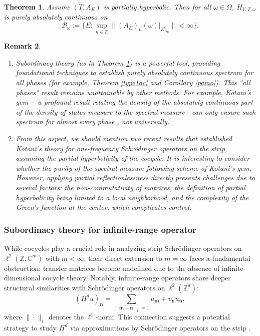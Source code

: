 \documentclass[11pt]{amsart}
\newtheorem{theorem}{Theorem}[section]
\newtheorem{rem}[theorem]{Remark}
\theoremstyle{remark}
\theoremstyle{definition}
\begin{document}
\begin{theorem}\label{thm:main-spectral} Assume $(T,A_E)$ is partially hyperbolic. Then for all $\omega \in \Omega$, $H_{V,T,\omega}$ is purely absolutely continuous on
\begin{equation}\label{defb}
\mathcal{B}_\omega:= \Big\{ E :  \sup_{n \in \mathbb{Z}} \|(A_E)_n(\omega)|_{E^c_{A_E}}\| < \infty \Big\}.
\end{equation}
\end{theorem}



\begin{rem}
\begin{enumerate}
 \item Subordinacy theory (as in Theorem \ref{thm:main-spectral}) is a powerful tool, providing foundational techniques to establish purely absolutely continuous spectrum for all phases (for example, Theorem \ref{type1ac} and Corollary \ref{pamo}).
This ``all phases" result remains unattainable by other methods. For example, Kotani's gem \cite{kotani2}—a profound result \cite{Da} relating the density of the absolutely continuous part of the density of states measure to the spectral measure—can only ensure such spectrum for almost every phase \cite{AD}, not universally.
\item     From this aspect, we should mention two recent results \cite{GJY, GX} that established Kotani's theory for one-frequency Schr\"odinger operators on the strip, assuming the partial hyperbolicity of the cocycle. It is interesting to consider whether the purity of the spectral measure following scheme of  Kotani's gem. 
    However, applying partial reflectionlessness \cite{GJY, GX}  directly presents challenges due to several factors: the non-commutativity of matrices, the definition of partial hyperbolicity being limited to a local neighborhood, and the complexity of the Green’s function at the center, which complicates control.
\end{enumerate}

\end{rem}




\subsubsection{Subordinacy theory for infinite-range operator}
While cocycles play a crucial role in analyzing strip Schr\"odinger operators on $\ell^2(\mathbb{Z},\mathbb{C}^m)$ with $m < \infty$, their direct extension to $m = \infty$ faces a fundamental obstruction: transfer matrices become undefined due to the absence of infinite-dimensional cocycle theory. Notably, infinite-range operators share deeper structural similarities with Schr\"odinger operators on $\ell^2(\mathbb{Z}^d)$:
\begin{equation*}\label{schrodinger-zd}
    (H^d u)_{\mathbf{n}} = \sum_{\|\mathbf{m}-\mathbf{n}\|_{1}=1} u_\mathbf{m} + v_\mathbf{n}u_\mathbf{n},
\end{equation*}
where $\|\cdot\|_1$ denotes the $\ell^1$-norm. This connection suggests a potential strategy to study \(H^d\) via approximations by Schr\"odinger operators on the strip \cite{Dam}.
\end{document}
